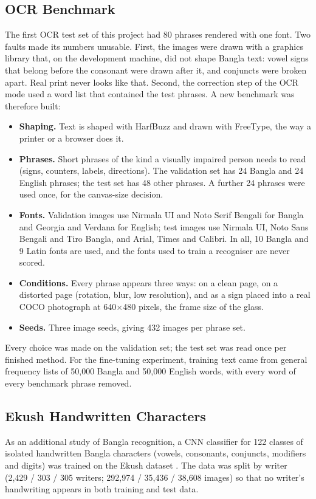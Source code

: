 \subsection{OCR Benchmark}
\label{sec:ocr_bench_data}
The first OCR test set of this project had 80 phrases rendered with one font. Two faults made its numbers unusable. First, the images were drawn with a graphics library that, on the development machine, did not shape Bangla text: vowel signs that belong before the consonant were drawn after it, and conjuncts were broken apart. Real print never looks like that. Second, the correction step of the OCR mode used a word list that contained the test phrases. A new benchmark was therefore built:
\begin{itemize}[noitemsep]
    \item \textbf{Shaping.} Text is shaped with HarfBuzz \cite{harfbuzz} and drawn with FreeType, the way a printer or a browser does it.
    \item \textbf{Phrases.} Short phrases of the kind a visually impaired person needs to read (signs, counters, labels, directions). The validation set has 24 Bangla and 24 English phrases; the test set has 48 other phrases. A further 24 phrases were used once, for the canvas-size decision.
    \item \textbf{Fonts.} Validation images use Nirmala UI and Noto Serif Bengali for Bangla and Georgia and Verdana for English; test images use Nirmala UI, Noto Sans Bengali and Tiro Bangla, and Arial, Times and Calibri. In all, 10 Bangla and 9 Latin fonts are used, and the fonts used to train a recogniser are never scored.
    \item \textbf{Conditions.} Every phrase appears three ways: on a clean page, on a distorted page (rotation, blur, low resolution), and as a sign placed into a real COCO photograph at 640$\times$480 pixels, the frame size of the glass.
    \item \textbf{Seeds.} Three image seeds, giving 432 images per phrase set.
\end{itemize}
Every choice was made on the validation set; the test set was read once per finished method. For the fine-tuning experiment, training text came from general frequency lists of 50,000 Bangla and 50,000 English words, with every word of every benchmark phrase removed.

\subsection{Ekush Handwritten Characters}
As an additional study of Bangla recognition, a CNN classifier for 122 classes of isolated handwritten Bangla characters (vowels, consonants, conjuncts, modifiers and digits) was trained on the Ekush dataset \cite{ekush}. The data was split by writer (2,429 / 303 / 305 writers; 292,974 / 35,436 / 38,608 images) so that no writer's handwriting appears in both training and test data.

